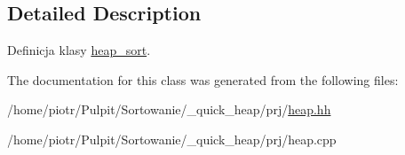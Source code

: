 \subsection{\-Detailed \-Description}
\-Definicja klasy \hyperlink{classheap__sort}{heap\-\_\-sort}. 



\-The documentation for this class was generated from the following files\-:\begin{DoxyCompactItemize}
\item 
/home/piotr/\-Pulpit/\-Sortowanie/\-\_\-quick\-\_\-heap/prj/\hyperlink{heap_8hh}{heap.\-hh}\item 
/home/piotr/\-Pulpit/\-Sortowanie/\-\_\-quick\-\_\-heap/prj/heap.\-cpp\end{DoxyCompactItemize}

